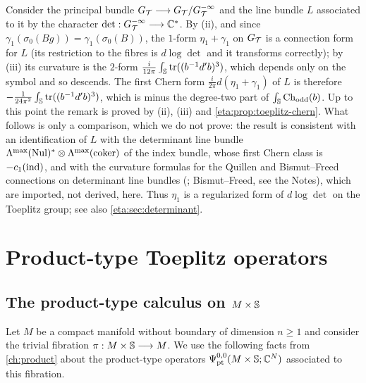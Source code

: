 \begin{remark}\label{eta:rem:determinant-connection}
Consider the principal bundle $G_{\mathcal{T}}\longrightarrow G_{\mathcal{T}}/G^{-\infty}_{\mathcal T}$ and the line
bundle $L$ associated to it by the character $\det:G^{-\infty}_{\mathcal T}\longrightarrow\mathbb{C}^*$.
By (ii), and since $\gamma_1(\sigma_0(Bg))=\gamma_1(\sigma_0(B))$, the $1$-form
$\eta_1+\gamma_1$ on $G_{\mathcal{T}}$ is a connection form for $L$ (its restriction to the
fibres is $d\log\det$ and it transforms correctly); by (iii) its curvature is the
$2$-form $\frac{i}{12\pi}\int_{\mathbb{S}}\operatorname{tr}((b^{-1}d'b)^3)$, which depends only on the
symbol and so descends. The first Chern form $\frac{i}{2\pi}d(\eta_1+\gamma_1)$ of $L$
is therefore $-\frac1{24\pi^2}\int_{\mathbb{S}}\operatorname{tr}((b^{-1}d'b)^3)$, which is minus the
degree-two part of $\int_{\mathbb{S}}\operatorname{Ch}_{\mathrm{odd}}(b)$. Up to this point the remark is proved by
(ii), (iii) and \cref{eta:prop:toeplitz-chern}. What follows is only a comparison,
which we do not prove: the result is consistent with an identification of $L$ with
the determinant line bundle $\Lambda^{\max}(\operatorname{Nul})^*\otimes\Lambda^{\max}(\text{coker})$
of the index bundle, whose first Chern class is $-c_1(\operatorname{ind})$, and with the curvature
formulas for the Quillen and Bismut--Freed connections on determinant line bundles
(\cite{Quillen}; Bismut--Freed, see the Notes), which are imported, not derived,
here. Thus $\eta_1$ is a regularized form of $d\log\det$ on the Toeplitz group; see
also \cref{eta:sec:determinant}.
\end{remark}

\section{Product-type Toeplitz operators}\label{eta:sec:product-toeplitz}

\subsection{The product-type calculus on $M\times\mathbb{S}$} Let $M$ be a compact
manifold without boundary of dimension $n\ge1$ and consider the trivial fibration
$\pi:M\times\mathbb{S}\longrightarrow M$. We use the following facts from
\cref{ch:product} about the product-type operators $\Psi^{0,0}_{\mathrm{pt}}(M\times\mathbb{S};\mathbb{C}^N)$
associated to this fibration.

